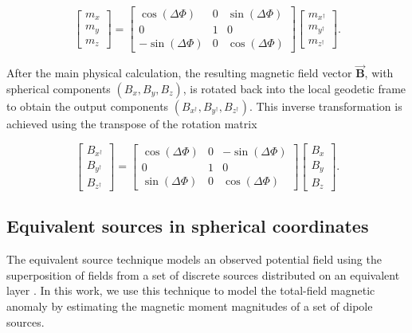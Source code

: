 \begin{equation}
\begin{bmatrix}
    m_{x} \\
    m_{y} \\
    m_{z}
\end{bmatrix}
=
\begin{bmatrix}
    \cos(\Delta\Phi)  & 0 & \sin(\Delta\Phi) \\
    0 & 1 & 0\\
    -\sin(\Delta\Phi) & 0 & \cos(\Delta\Phi)
\end{bmatrix}
\begin{bmatrix}
    m_{x^{\dagger}} \\
    m_{y^{\dagger}} \\
    m_{z^{\dagger}}
\end{bmatrix} .
\end{equation}

After the main physical calculation, the resulting magnetic field vector $\vec{\mathbf{B}}$, with
spherical components $(B_x, B_y, B_z)$, is rotated back into the local geodetic frame to
obtain the output components $(B_{x^{\dagger}}, B_{y^{\dagger}}, B_{z^{\dagger}})$. This inverse transformation is achieved using the transpose
of the rotation matrix

\begin{equation}
\begin{bmatrix}
    B_{x^{\dagger}} \\
    B_{y^{\dagger}} \\
    B_{z^{\dagger}}
\end{bmatrix}
=
\begin{bmatrix}
    \cos(\Delta\Phi) & 0 & -\sin(\Delta\Phi) \\
    0 & 1 & 0 \\
    \sin(\Delta\Phi) & 0 & \cos(\Delta\Phi)
\end{bmatrix}
\begin{bmatrix}
    B_x \\
    B_y \\
    B_z
\end{bmatrix}.
\end{equation}

\subsection{Equivalent sources in spherical coordinates}

The equivalent source technique models an observed potential field using the superposition of fields
from a set of discrete sources distributed on an equivalent layer \citep{Dampney1969, OliveiraJunior2023}.
In this work, we use this technique to model the total-field magnetic anomaly by estimating the magnetic
moment magnitudes of a set of dipole sources.

